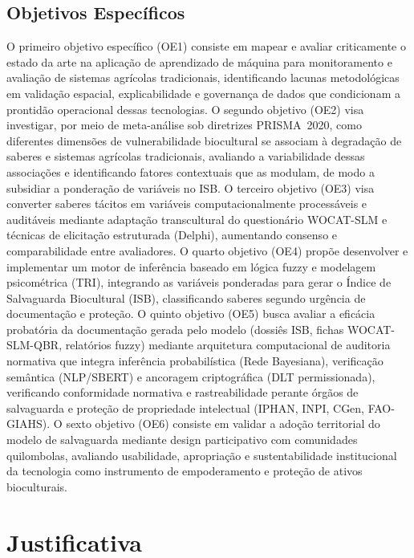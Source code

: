 \subsection{Objetivos Específicos}

O primeiro objetivo específico (OE1) consiste em mapear e avaliar criticamente o estado da arte na aplicação de aprendizado de máquina para monitoramento e avaliação de sistemas agrícolas tradicionais, identificando lacunas metodológicas em validação espacial, explicabilidade e governança de dados que condicionam a prontidão operacional dessas tecnologias. O segundo objetivo (OE2) visa investigar, por meio de meta-análise sob diretrizes PRISMA~2020, como diferentes dimensões de vulnerabilidade biocultural se associam à degradação de saberes e sistemas agrícolas tradicionais, avaliando a variabilidade dessas associações e identificando fatores contextuais que as modulam, de modo a subsidiar a ponderação de variáveis no ISB. O terceiro objetivo (OE3) visa converter saberes tácitos em variáveis computacionalmente processáveis e auditáveis mediante adaptação transcultural do questionário WOCAT-SLM e técnicas de elicitação estruturada (Delphi), aumentando consenso e comparabilidade entre avaliadores. O quarto objetivo (OE4) propõe desenvolver e implementar um motor de inferência baseado em lógica fuzzy e modelagem psicométrica (TRI), integrando as variáveis ponderadas para gerar o Índice de Salvaguarda Biocultural (ISB), classificando saberes segundo urgência de documentação e proteção. O quinto objetivo (OE5) busca avaliar a eficácia probatória da documentação gerada pelo modelo (dossiês ISB, fichas WOCAT-SLM-QBR, relatórios fuzzy) mediante arquitetura computacional de auditoria normativa que integra inferência probabilística (Rede Bayesiana), verificação semântica (NLP/SBERT) e ancoragem criptográfica (DLT permissionada), verificando conformidade normativa e rastreabilidade perante órgãos de salvaguarda e proteção de propriedade intelectual (IPHAN, INPI, CGen, FAO-GIAHS). O sexto objetivo (OE6) consiste em validar a adoção territorial do modelo de salvaguarda mediante design participativo com comunidades quilombolas, avaliando usabilidade, apropriação e sustentabilidade institucional da tecnologia como instrumento de empoderamento e proteção de ativos bioculturais.


\section{Justificativa}

